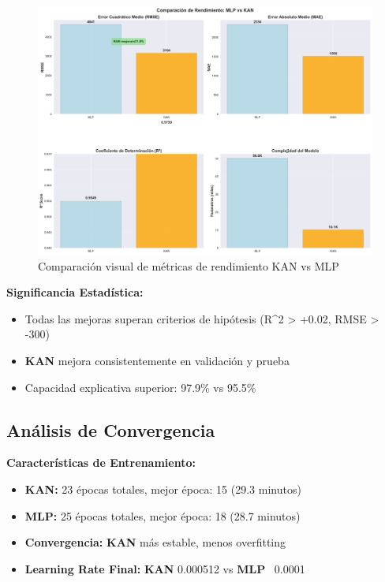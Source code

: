 \documentclass[10pt,twocolumn]{article}
\newcommand{\kan}{\textbf{KAN}}
\newcommand{\mlp}{\textbf{MLP}}
\newcommand{\rsquared}{R^2}
\begin{document}
\begin{figure}[H]
    \centering
    \includegraphics[width=\textwidth]{reports/figura_3_comparacion_rendimiento.png}
    \caption{Comparación visual de métricas de rendimiento KAN vs MLP}
    \label{fig:performance}
\end{figure}

\textbf{Significancia Estadística:}
\begin{itemize}
    \item Todas las mejoras superan criterios de hipótesis (\rsquared{} > +0.02, RMSE > -300)
    \item \kan{} mejora consistentemente en validación y prueba
    \item Capacidad explicativa superior: 97.9\% vs 95.5\%
\end{itemize}

\subsection{Análisis de Convergencia}

\textbf{Características de Entrenamiento:}
\begin{itemize}
    \item \textbf{\kan:} 23 épocas totales, mejor época: 15 (29.3 minutos)
    \item \textbf{\mlp:} 25 épocas totales, mejor época: 18 (28.7 minutos)
    \item \textbf{Convergencia:} \kan{} más estable, menos overfitting
    \item \textbf{Learning Rate Final:} \kan{} 0.000512 vs \mlp{} ~0.0001
\end{itemize}
\end{document}
